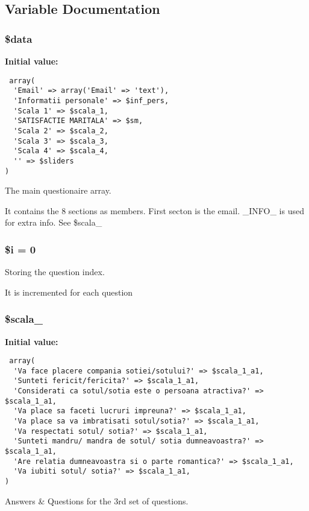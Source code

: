 \subsection{Variable Documentation}
\subsubsection{\setlength{\rightskip}{0pt plus 5cm}\$data}\label{d1/d7c/a00003_6efc15b5a2314dd4b5aaa556a375c6d6}


\textbf{Initial value:}

\begin{Code}\begin{verbatim} array(
  'Email' => array('Email' => 'text'),
  'Informatii personale' => $inf_pers,
  'Scala 1' => $scala_1,
  'SATISFACTIE MARITALA' => $sm,
  'Scala 2' => $scala_2,
  'Scala 3' => $scala_3,
  'Scala 4' => $scala_4,
  '' => $sliders
)
\end{verbatim}\end{Code}
The main questionaire array. 

It contains the 8 sections as members. First secton is the email. \_\-INFO\_\- is used for extra info. See \$scala\_ 
\subsubsection{\setlength{\rightskip}{0pt plus 5cm}\$i = 0}\label{d1/d7c/a00003_83018d9153d17d91fbcf3bc10158d34f}


Storing the question index. 

It is incremented for each question 
\subsubsection{\setlength{\rightskip}{0pt plus 5cm}\$scala\_}\label{d1/d7c/a00003_01278c602fff48237f84094690443dc1}


\textbf{Initial value:}

\begin{Code}\begin{verbatim} array(
  'Va face placere compania sotiei/sotului?' => $scala_1_a1,
  'Sunteti fericit/fericita?' => $scala_1_a1,
  'Considerati ca sotul/sotia este o persoana atractiva?' => $scala_1_a1,
  'Va place sa faceti lucruri impreuna?' => $scala_1_a1,
  'Va place sa va imbratisati sotul/sotia?' => $scala_1_a1,
  'Va respectati sotul/ sotia?' => $scala_1_a1,
  'Sunteti mandru/ mandra de sotul/ sotia dumneavoastra?' => $scala_1_a1,
  'Are relatia dumneavoastra si o parte romantica?' => $scala_1_a1,
  'Va iubiti sotul/ sotia?' => $scala_1_a1,
)
\end{verbatim}\end{Code}
Answers \& Questions for the 3rd set of questions. 

